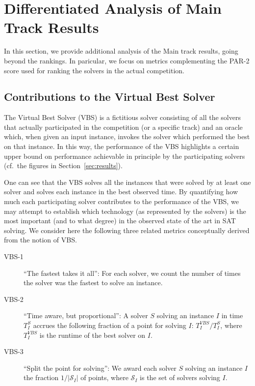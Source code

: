 \documentclass{elsarticle}
\begin{document}
\section{Differentiated Analysis of Main Track Results}
\label{sec:analysis}

In this section, we provide additional analysis of the Main track results, going beyond the rankings.
In paricular, we focus on metrics complementing the PAR-2 score used for ranking the solvers in the actual competition.

\subsection{Contributions to the Virtual Best Solver}

\label{subsec:vbs_explained}

The Virtual Best Solver (VBS) is a fictitious solver consisting 
of all the solvers that actually participated in the competition (or a specific track)
and an oracle which, when given an input instance,
invokes  the  solver which performed the best on that instance.
In this way, the performance of the VBS highlights a certain upper bound 
on performance achievable in principle by the 
 participating solvers (cf.~the figures in Section~\ref{sec:results}). 

One can see that the VBS solves all the instances that
were solved by at least one solver and solves each instance in the best observed time.
By quantifying how much each participating solver contributes
to the performance of the VBS, we may attempt to establish which
technology (as represented by the solvers) is the most important
(and to what degree) in the observed state of the art in SAT solving.
We consider here the following three related metrics conceptually derived
from the notion of VBS.

\begin{description}
\item[VBS-1]
``The fastest takes it all'':
For each solver, we count the number of times the solver was the fastest to solve an instance.
\item[VBS-2]
``Time aware, but proportional'':
A solver $S$ solving an instance $I$ in time $T^S_I$ accrues 
the following fraction of a point for solving $I$:
$T^\mathit{VBS}_I/T^S_I$, where $T^\mathit{VBS}_I$ is the runtime of the best solver on $I$.
\item[VBS-3]
``Split the point for solving'':
We award each solver $S$ solving an instance $I$ the fraction $1/|\mathcal{S}_I|$ of points, where
$\mathcal{S}_I$ is the set of solvers solving $I$.
\end{description}
\end{document}
